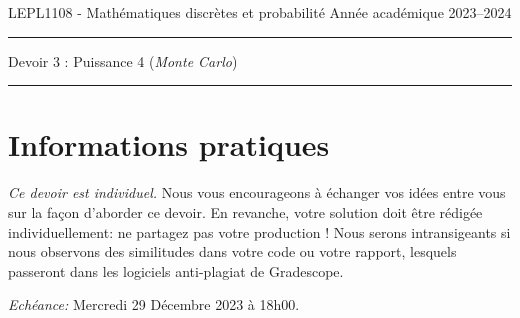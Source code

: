 \documentclass[11pt,answers]{exam}
\begin{document}
\noindent
LEPL1108 - Mathématiques discrètes et probabilité \hfill Année académique 2023--2024\\[-2mm]
\rule{\linewidth}{0.5pt}

\begin{center}

{\large Devoir 3 : Puissance 4 (\textit{Monte Carlo})}
\bigskip

\end{center}
\hrule
\bigskip

\section*{Informations pratiques}
\noindent

\noindent
\emph{Ce devoir est individuel.} Nous vous encourageons à échanger vos idées entre vous sur la façon d'aborder ce devoir. En revanche, votre solution doit être rédigée individuellement: ne partagez pas votre production ! Nous serons intransigeants si nous observons des similitudes dans votre code ou votre rapport, lesquels passeront dans les logiciels anti-plagiat de Gradescope.

\bigskip \noindent
\emph{Echéance:} Mercredi 29 Décembre 2023 à 18h00.

\bigskip


\noindent
\end{document}
